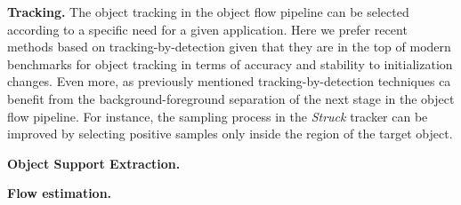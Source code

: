 \textbf{Tracking.} The object tracking in the object flow pipeline can be selected according to a specific need for a given application. Here we prefer recent methods based on tracking-by-detection given that they are in the top of modern benchmarks for object tracking \cite{c16} in terms of accuracy and stability to initialization changes. Even more, as previously mentioned 
tracking-by-detection techniques ca benefit from the background-foreground separation of the next stage in the object flow pipeline. For instance, the sampling process in the {\it Struck} 
tracker can be improved by selecting positive samples only inside the region of the target object.


\textbf{Object Support Extraction.} 

\textbf{Flow estimation.} 